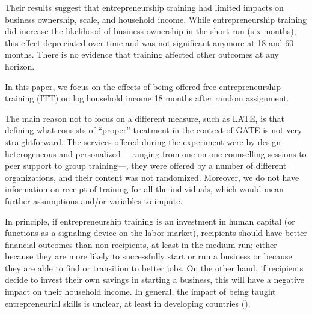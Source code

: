 Their results suggest that entrepreneurship training had limited impacts on business ownership, scale, and household income. While entrepreneurship training did increase the likelihood of business ownership in the short-run (six months), this effect depreciated over time and was not significant anymore at 18 and 60 months. There is no evidence that training affected other outcomes at any horizon.

In this paper, we focus on the effects of being offered free entrepreneurship training (\ac{ITT}) on log household income 18 months after random assignment.

The main reason not to focus on a different measure, such as \ac{LATE}, is that defining what consists of ``proper'' treatment in the context of \ac{GATE} is not very straightforward. The services offered during the experiment were by design heterogeneous and personalized ---ranging from one-on-one counselling sessions to peer support to group training---, they were offered by a number of different organizations, and their content was not randomized. Moreover, we do not have information on receipt of training for all the individuals, which would mean further assumptions and/or variables to impute.

In principle, if entrepreneurship training is an investment in human capital (or functions as a signaling device on the labor market), recipients should have better financial outcomes than non-recipients, at least in the medium run; either because they are more likely to successfully start or run a business or because they are able to find or transition to better jobs. On the other hand, if recipients decide to invest their own savings in starting a business, this will have a negative impact on their household income. In general, the impact of being taught entrepreneurial skills is unclear, at least in developing countries (\cite{mckenzie2014}).
